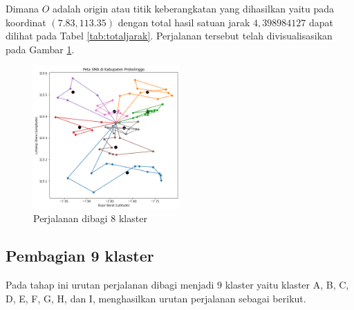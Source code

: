Dimana $O$ adalah origin atau titik keberangkatan yang dihasilkan yaitu pada koordinat $(7.83, 113.35)$ dengan total hasil satuan jarak $4,398984127$ dapat dilihat pada Tabel \ref{tab:totaljarak}. Perjalanan tersebut telah divisualisasikan pada Gambar \ref{fig:hasil_mtsp8}.

\begin{figure}[H]
\centering
\includegraphics[width=0.5\textwidth]{Gambar/hasil_mtsp/8}
\caption{Perjalanan dibagi 8 klaster}
\label{fig:hasil_mtsp8}
\end{figure}

\subsection{Pembagian 9 klaster}

Pada tahap ini urutan perjalanan dibagi menjadi 9 klaster yaitu klaster A, B, C, D, E, F, G, H, dan I, menghasilkan urutan perjalanan sebagai berikut.

